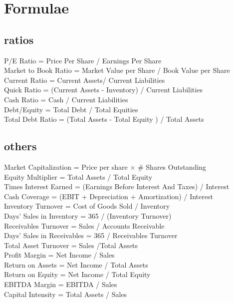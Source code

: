 \section{Formulae}
\subsection*{ratios}
\begin{scriptsize}
P/E Ratio = Price Per Share / Earnings Per Share \\
Market to Book Ratio = Market Value per Share / Book Value per Share \\
Current Ratio = Current Assets/ Current Liabilities \\
Quick Ratio = (Current Assets - Inventory) / Current Liabilities \\
Cash Ratio = Cash / Current Liabilities \\
Debt/Equity = Total Debt / Total Equities \\
Total Debt Ratio = (Total Assets - Total Equity ) / Total Assets \\
\end{scriptsize}
\subsection*{others}
\begin{scriptsize}
Market Capitalization = Price per share $\times$ \# Shares Outstanding \\
Equity Multiplier = Total Assets / Total Equity \\
Times Interest Earned = (Earnings Before Interest And Taxes) / Interest \\
Cash Coverage = (EBIT + Depreciation + Amortization) / Interest \\
Inventory Turnover = Cost of Goods Sold / Inventory \\
Days' Sales in Inventory = 365 / (Inventory Turnover) \\
Receivables Turnover = Sales / Accounts Receivable \\
Days' Sales in Receivables = 365 / Receivables Turnover \\
Total Asset Turnover = Sales  /Total Assets  \\
Profit Margin = Net Income / Sales \\
Return on Assets = Net Income / Total Assets \\
Return on Equity = Net Income / Total Equity \\
EBITDA Margin = EBITDA / Sales \\
Capital Intensity = Total Assets / Sales \\
\end{scriptsize}
